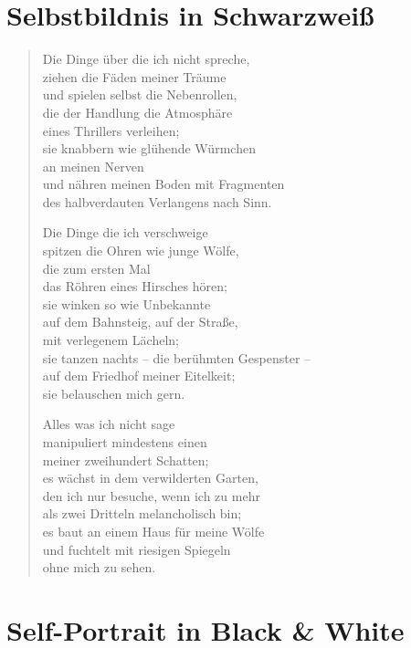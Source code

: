 
\cleartoverso

\section{Selbstbildnis in Schwarzweiß}

\begin{verse}

Die Dinge über die ich nicht spreche,\\
ziehen die Fäden meiner Träume\\
und spielen selbst die Nebenrollen,\\
die der Handlung die Atmosphäre\\
eines Thrillers verleihen;\\
sie knabbern wie glühende Würmchen\\
an meinen Nerven\\
und nähren meinen Boden mit Fragmenten\\
des halbverdauten Verlangens nach Sinn.

Die Dinge die ich verschweige\\
spitzen die Ohren wie junge Wölfe,\\
die zum ersten Mal\\
das Röhren eines Hirsches hören;\\
sie winken so wie Unbekannte\\
auf dem Bahnsteig, auf der Straße,\\
mit verlegenem Lächeln;\\
sie tanzen nachts -- die berühmten Gespenster --\\
auf dem Friedhof meiner Eitelkeit;\\
sie belauschen mich gern.

Alles was ich nicht sage\\
manipuliert mindestens einen\\
meiner zweihundert Schatten;\\
es wächst in dem verwilderten Garten,\\
den ich nur besuche, wenn ich zu mehr\\
als zwei Dritteln melancholisch bin;\\
es baut an einem Haus für meine Wölfe\\
und fuchtelt mit riesigen Spiegeln\\
ohne mich zu sehen.
\end{verse}

\clearpage

\section{Self-Portrait in Black \& White}

